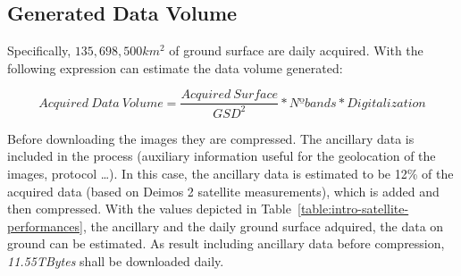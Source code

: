 \subsection{Generated Data Volume}

Specifically, $135,698,500 km^2$ of ground surface are daily acquired. With the following expression can estimate the data volume generated:

\begin{equation}
Acquired~Data~Volume= \frac{Acquired~Surface}{GSD^2} * Nº bands * Digitalization
\end{equation}

Before downloading the images they are compressed. The ancillary data is
included in the process (auxiliary information useful for the geolocation of the
images, protocol \ldots). In this case, the ancillary data is estimated to be
12\% of the acquired data (based on Deimos 2 satellite measurements), which is
added and then compressed. With the values depicted in
Table~\ref{table:intro-satellite-performances}, the ancillary and the daily ground
surface adquired, the data on ground can be estimated. As result including ancillary data before compression, \emph{11.55TBytes} shall be downloaded daily.

